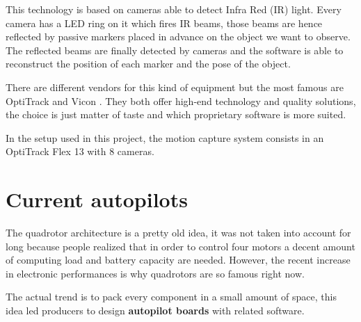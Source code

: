 This technology is based on cameras able to detect Infra Red (IR) light. Every camera has a LED ring on it which fires IR beams, those beams are hence reflected by passive markers placed in advance on the object we want to observe. The reflected beams are finally detected by cameras and the software is able to reconstruct the position of each marker and the pose of the object.\par
There are different vendors for this kind of equipment but the most famous are OptiTrack \cite{OptiT} and Vicon \cite{vicon}. They both offer high-end technology and quality solutions, the choice is just matter of taste and which proprietary software is more suited.\par In the setup used in this project, the motion capture system consists in an OptiTrack Flex 13 with 8 cameras.


\section{Current autopilots}

The quadrotor architecture is a pretty old idea, it was not taken into account for long because people realized that in order to control four motors a decent amount of computing load and battery capacity are needed. However, the recent increase in electronic performances is why quadrotors are so famous right now.\par The actual trend is to pack every component in a small amount of space, this idea led producers to design \textbf{autopilot boards} with related software.


